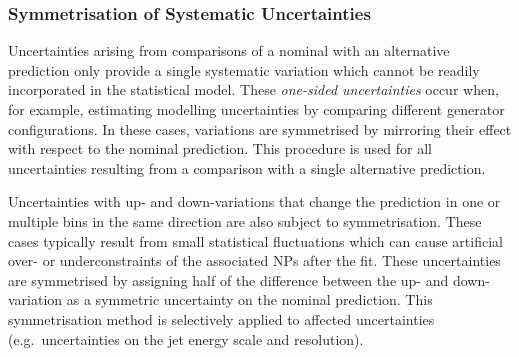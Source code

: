 


\subsubsection{Symmetrisation of Systematic Uncertainties}

Uncertainties arising from comparisons of a nominal with an alternative
prediction only provide a single systematic variation which cannot be readily
incorporated in the statistical model. These \emph{one-sided uncertainties}
occur when, for example, estimating modelling uncertainties by comparing
different generator configurations. In these cases, variations are symmetrised
by mirroring their effect with respect to the nominal prediction. This procedure
is used for all uncertainties resulting from a comparison with a single
alternative prediction.

Uncertainties with up- and down-variations that change the prediction in one or
multiple bins in the same direction are also subject to symmetrisation. These
cases typically result from small statistical fluctuations which can cause
artificial over- or underconstraints of the associated NPs after the fit.
These uncertainties are symmetrised by assigning half of the difference between
the up- and down-variation as a symmetric uncertainty on the nominal
prediction. This symmetrisation method is selectively applied to affected
uncertainties (e.g.\ uncertainties on the jet energy scale and resolution).



